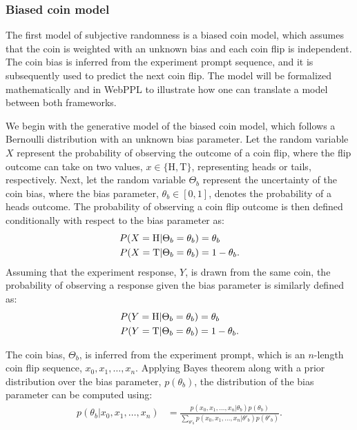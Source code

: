 \documentclass[11pt]{article}
\begin{document}
\subsubsection{Biased coin model}
\label{s:tutorial:sss:biased}

The first model of subjective randomness is a biased coin model, which assumes that the coin is weighted with an unknown bias and each coin flip is independent. The coin bias is inferred from the experiment prompt sequence, and it is subsequently used to predict the next coin flip. The model will be formalized mathematically and in WebPPL to illustrate how one can translate a model between both frameworks.

We begin with the generative model of the biased coin model, which follows a Bernoulli distribution with an unknown bias parameter. Let the random variable $X$ represent the probability of observing the outcome of a coin flip, where the flip outcome can take on two values, $x \in \{\textrm{H},\textrm{T}\}$, representing heads or tails, respectively. Next, let the random variable $\Theta_b$ represent the uncertainty of the coin bias, where the bias parameter, $\theta_b \in [0,1]$, denotes the probability of a heads outcome. The probability of observing a coin flip outcome is then defined conditionally with respect to the bias parameter as:
\begin{align}
    P(X = \textrm{H} | \Theta_b = \theta_b) &= \theta_b \notag \\ 
    P(X = \textrm{T} | \Theta_b = \theta_b) &= 1 - \theta_b \label{eq:bcoin_x}.
\end{align}
Assuming that the experiment response, $Y$, is drawn from the same coin, the probability of observing a response given the bias parameter is similarly defined as: 
\begin{align}
    P(Y = \textrm{H} | \Theta_b = \theta_b) &= \theta_b \notag \\ 
    P(Y = \textrm{T} | \Theta_b = \theta_b) &= 1 - \theta_b \label{eq:bcoin_y}.
\end{align}

The coin bias, $\Theta_b$, is inferred from the experiment prompt, which is an $n$-length coin flip sequence, $x_0, x_1, \dots, x_n$. Applying Bayes theorem along with a prior distribution over the bias parameter, $p(\theta_b)$, the distribution of the bias parameter can be computed using:
\begin{align}
    p(\theta_b | x_0, x_1, \dots, x_n) &= \frac{p(x_0,x_1, \dots, x_n | \theta_b)p(\theta_b)} {\sum\limits_{\theta'_b} p(x_0, x_1, \dots, x_n | \theta'_b)p(\theta'_b)} \label{eq:bcoin_bayes}.
\end{align}
\end{document}
